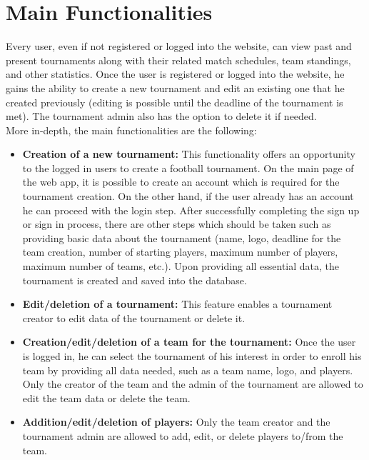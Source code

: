 \section{Main Functionalities}

\noindent Every user, even if not registered or logged into the website, can view past and present tournaments along with their related match schedules, team standings,
and other statistics. Once the user is registered or logged into the website, he gains the ability to create a new  tournament and edit an existing one that he created previously (editing is possible until the deadline of the tournament is met). The tournament admin also has the option to delete it if needed. \\

\noindent More in-depth, the main functionalities are the following:
\begin{itemize}
    \item \textbf{Creation of a new tournament:}
        This functionality offers an opportunity to the logged in users to create a football tournament. On the main page of the web app, it is possible to create an account which is required for the tournament creation. On the other hand, if the user already has an account he can proceed with the login step. After successfully completing the sign up or sign in process, there are other steps which should be taken such as providing basic data about the tournament (name, logo, deadline for the team creation, number of starting players, maximum number of players, maximum number of teams, etc.). Upon providing all essential data, the tournament is created and saved into the database.

        \item \textbf{Edit/deletion of a tournament:}
        This feature enables a tournament creator to edit data of the tournament or delete it.

    \item \textbf{Creation/edit/deletion of a team for the tournament:}
        Once the user is logged in, he can select the tournament of his interest in order to enroll his team by providing all data needed, such as a team name, logo, and players. Only the creator of the team and the admin of the tournament are allowed to edit the team data or delete the team.

    \item \textbf{Addition/edit/deletion of players:}
        Only the team creator and the tournament admin are allowed to add, edit, or delete players to/from the team.


\end{itemize}
